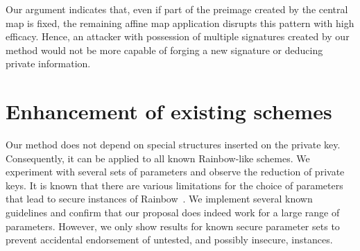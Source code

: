 \documentclass[12pt, a4paper, oneside]{memoir}
\theoremstyle{definition}
\begin{document}

Our argument indicates that, even if part of the preimage created by the
central map is fixed, the remaining affine map application disrupts this
pattern with high efficacy. Hence, an attacker with possession of multiple
signatures created by our method would not be more capable of forging a new
signature or deducing private information.

\section{Enhancement of existing schemes}\label{sec:experiments}

Our method does not depend on special structures inserted on the private key.
Consequently, it can be applied to all known Rainbow-like schemes. We
experiment with several sets of parameters and observe the reduction of private
keys. It is known that there are various limitations for the choice of
parameters that lead to secure instances of
Rainbow~\cite{Petzoldt:201005}. We implement several known guidelines
and confirm that our proposal does indeed work for a large range of parameters.
However, we only show results for known secure parameter sets to prevent
accidental endorsement of untested, and possibly insecure, instances.
\end{document}
